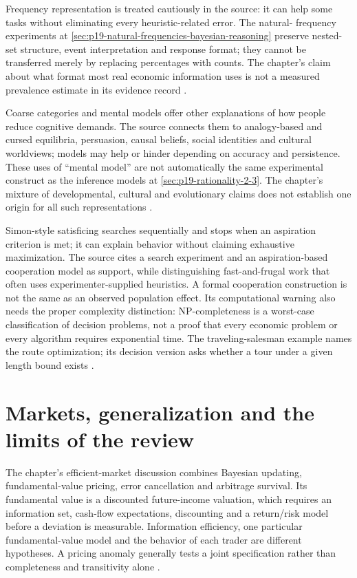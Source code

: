 Frequency representation is treated cautiously in the source: it can help
some tasks without eliminating every heuristic-related error. The natural-
frequency experiments at
\cref{sec:p19-natural-frequencies-bayesian-reasoning} preserve nested-set
structure, event interpretation and response format; they cannot be
transferred merely by replacing percentages with counts. The chapter's
claim about what format most real economic information uses is not a
measured prevalence estimate in its evidence record
\cite[p.~573]{DhamiAlNowaihi2021Economics}.

Coarse categories and mental models offer other explanations of how people
reduce cognitive demands. The source connects them to analogy-based and
cursed equilibria, persuasion, causal beliefs, social identities and cultural
worldviews; models may help or hinder depending on accuracy and persistence.
These uses of ``mental model'' are not automatically the same experimental
construct as the inference models at \cref{sec:p19-rationality-2-3}.
The chapter's mixture of developmental, cultural and evolutionary claims
does not establish one origin for all such representations
\cite[p.~573]{DhamiAlNowaihi2021Economics}.

Simon-style satisficing searches sequentially and stops when an aspiration
criterion is met; it can explain behavior without claiming exhaustive
maximization. The source cites a search experiment and an aspiration-based
cooperation model as support, while distinguishing fast-and-frugal work
that often uses experimenter-supplied heuristics. A formal cooperation
construction is not the same as an observed population effect. Its
computational warning also needs the proper complexity distinction:
NP-completeness is a worst-case classification of decision problems, not
a proof that every economic problem or every algorithm requires exponential
time. The traveling-salesman example names the route optimization; its
decision version asks whether a tour under a given length bound exists
\cite[p.~573, note~10]{DhamiAlNowaihi2021Economics}.

\section{Markets, generalization and the limits of the review}
\label{sec:p19-r94-markets}

The chapter's efficient-market discussion combines Bayesian updating,
fundamental-value pricing, error cancellation and arbitrage survival.
Its fundamental value is a discounted future-income valuation, which
requires an information set, cash-flow expectations, discounting and a
return/risk model before a deviation is measurable. Information efficiency,
one particular fundamental-value model and the behavior of each trader
are different hypotheses. A pricing anomaly generally tests a joint
specification rather than completeness and transitivity alone
\cite[pp.~569--570, 573--574]{DhamiAlNowaihi2021Economics}.

